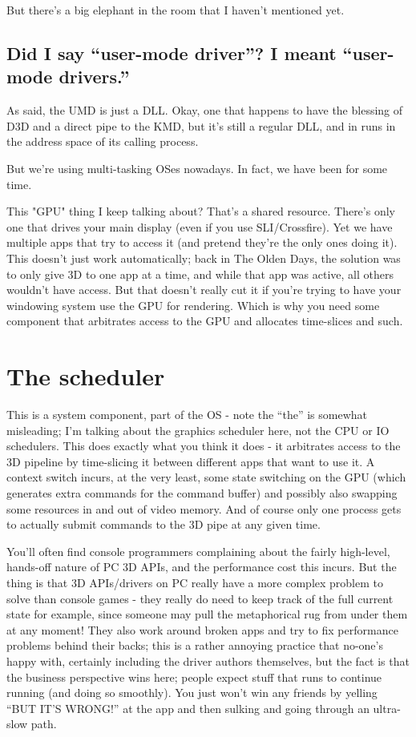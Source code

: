 But there's a big elephant in the room that I haven't mentioned yet.

\subsection*{Did I say ``user-mode driver''? I meant ``user-mode drivers.''}

As said, the UMD is just a DLL. Okay, one that happens to have the blessing of
D3D and a direct pipe to the KMD, but it's still a regular DLL, and in runs in
the address space of its calling process.

But we're using multi-tasking OSes nowadays. In fact, we have been for some
time.

This "GPU" thing I keep talking about? That's a shared resource. There's only
one that drives your main display (even if you use SLI/Crossfire). Yet we have
multiple apps that try to access it (and pretend they're the only ones doing
it). This doesn't just work automatically; back in The Olden Days, the solution
was to only give 3D to one app at a time, and while that app was active, all
others wouldn't have access. But that doesn't really cut it if you're trying to
have your windowing system use the GPU for rendering. Which is why you need
some component that arbitrates access to the GPU and allocates time-slices and
such.

\section{The scheduler}

This is a system component, part of the OS - note the ``the'' is somewhat
misleading; I'm talking about the graphics scheduler here, not the CPU or IO
schedulers. This does exactly what you think it does - it arbitrates access to
the 3D pipeline by time-slicing it between different apps that want to use it.
A context switch incurs, at the very least, some state switching on the GPU
(which generates extra commands for the command buffer) and possibly also
swapping some resources in and out of video memory.  And of course only one
process gets to actually submit commands to the 3D pipe at any given time.

You'll often find console programmers complaining about the fairly high-level,
hands-off nature of PC 3D APIs, and the performance cost this incurs. But the
thing is that 3D APIs/drivers on PC really have a more complex problem to solve
than console games - they really do need to keep track of the full current
state for example, since someone may pull the metaphorical rug from under them
at any moment! They also work around broken apps and try to fix performance
problems behind their backs; this is a rather annoying practice that no-one's
happy with, certainly including the driver authors themselves, but the fact is
that the business perspective wins here; people expect stuff that runs to
continue running (and doing so smoothly). You just won't win any friends by
yelling ``BUT IT'S WRONG!'' at the app and then sulking and going through an
ultra-slow path.

